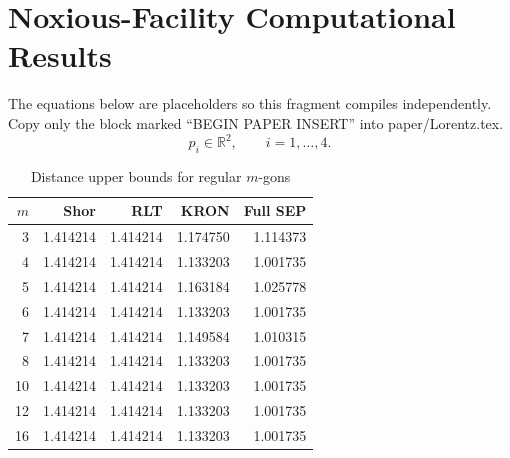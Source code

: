 \documentclass[11pt]{article}
\begin{document}
\section*{Noxious-Facility Computational Results}

The equations below are placeholders so this fragment compiles
independently.  Copy only the block marked ``BEGIN PAPER INSERT''
into paper/Lorentz.tex.
\begin{equation}
\label{eq:targeted}
p_i\in\mathbb{R}^2,\qquad i=1,\ldots,4.
\end{equation}

\begin{table}
\caption{Distance upper bounds for regular \(m\)-gons}
\vskip 10pt
\label{tab:regular}
\centering
\begin{tabular}{r|rrrr}
\toprule
\(m\) & Shor & RLT & KRON & Full SEP \\
\midrule
3  & 1.414214 & 1.414214 & 1.174750 & 1.114373 \\
4  & 1.414214 & 1.414214 & 1.133203 & 1.001735 \\
5  & 1.414214 & 1.414214 & 1.163184 & 1.025778 \\
6  & 1.414214 & 1.414214 & 1.133203 & 1.001735 \\
7  & 1.414214 & 1.414214 & 1.149584 & 1.010315 \\
8  & 1.414214 & 1.414214 & 1.133203 & 1.001735 \\
10 & 1.414214 & 1.414214 & 1.133203 & 1.001735 \\
12 & 1.414214 & 1.414214 & 1.133203 & 1.001735 \\
16 & 1.414214 & 1.414214 & 1.133203 & 1.001735 \\
\bottomrule
\end{tabular}
\end{table}
\end{document}
